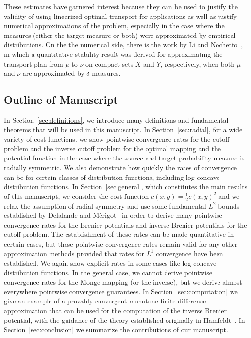 \documentclass{amsart}
\theoremstyle{lemma}
\theoremstyle{remark}
\begin{document}
These estimates have garnered interest because they can be used to justify the validity of using linearized optimal transport for applications as well as justify numerical approximations of the problem, especially in the case where the measures (either the target measure or both) were approximated by empirical distributions.  On the the numerical side, there is the work by Li and Nochetto~\cite{stabilitywenbo}, in which a quantitative stability result was derived for approximating the transport plan from $\mu$ to $\nu$ on compact sets $X$ and $Y$, respectively, when both $\mu$ and $\nu$ are approximated by $\delta$ measures.

\subsection{Outline of Manuscript}

In Section~\ref{sec:definitions}, we introduce many definitions and fundamental theorems that will be used in this manuscript. In Section~\ref{sec:radial}, for a wide variety of cost functions, we show pointwise convergence rates for the cutoff problem and the inverse cutoff problem for the optimal mapping and the potential function in the case where the source and target probability measure is radially symmetric. We also demonstrate how quickly the rates of convergence can be for certain classes of distribution functions, including log-concave distribution functions. In Section~\ref{sec:general}, which constitutes the main results of this manuscript, we consider the cost function $c(x,y) = \frac{1}{2}c(x,y)^2$ and we relax the assumption of radial symmetry and use some fundamental $L^2$ bounds established by Delalande and M\'{e}rigot~\cite{merigot1} in order to derive many pointwise convergence rates for the Brenier potentials and inverse Brenier potentials for the cutoff problem. The establishment of these rates can be made quantitative in certain cases, but these pointwise convergence rates remain valid for any other approximation methods provided that rates for $L^1$ convergence have been established. We again show explicit rates in some cases like log-concave distribution functions. In the general case, we cannot derive pointwise convergence rates for the Monge mapping (or the inverse), but we derive almost-everywhere pointwise convergence guarantees. In Section~\ref{sec:computation} we give an example of a provably convergent monotone finite-difference approximation that can be used for the computation of the inverse Brenier potential, with the guidance of the theory established originally in Hamfeldt~\cite{HamfeldtBVP2}. In Section~\ref{sec:conclusion} we summarize the contributions of our manuscript.
\end{document}

